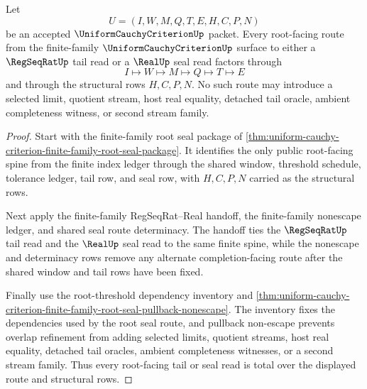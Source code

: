 \begin{theorem}
\label{thm:uniform-cauchy-criterion-root-tail-seal-route-totality}
Let
$$
U=(I,W,M,Q,T,E,H,C,P,N)
$$
be an accepted $\UniformCauchyCriterionUp$ packet. Every root-facing route from the finite-family $\UniformCauchyCriterionUp$ surface to either a $\RegSeqRatUp$ tail read or a $\RealUp$ seal read factors through
$$
I \longmapsto W \longmapsto M \longmapsto Q \longmapsto T \longmapsto E
$$
and through the structural rows $H,C,P,N$. No such route may introduce a selected limit, quotient stream, host real equality, detached tail oracle, ambient completeness witness, or second stream family.
\end{theorem}
\begin{proof}
Start with the finite-family root seal package of \autoref{thm:uniform-cauchy-criterion-finite-family-root-seal-package}. It identifies the only public root-facing spine from the finite index ledger through the shared window, threshold schedule, tolerance ledger, tail row, and seal row, with $H,C,P,N$ carried as the structural rows.

Next apply the finite-family RegSeqRat--Real handoff, the finite-family nonescape ledger, and shared seal route determinacy. The handoff ties the $\RegSeqRatUp$ tail read and the $\RealUp$ seal read to the same finite spine, while the nonescape and determinacy rows remove any alternate completion-facing route after the shared window and tail rows have been fixed.

Finally use the root-threshold dependency inventory and \autoref{thm:uniform-cauchy-criterion-finite-family-root-seal-pullback-nonescape}. The inventory fixes the dependencies used by the root seal route, and pullback non-escape prevents overlap refinement from adding selected limits, quotient streams, host real equality, detached tail oracles, ambient completeness witnesses, or a second stream family. Thus every root-facing tail or seal read is total over the displayed route and structural rows.
\end{proof}

